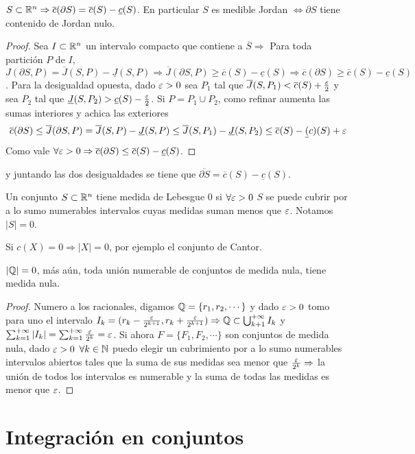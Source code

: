 \begin{theorem}
  $S \subset \mathbb{R}^n \Rightarrow \overline{c}(\partial S) = \overline{c}(S) - \underline{c}(S)$. En particular $S$ es medible Jordan $\iff \partial S$ tiene contenido de Jordan nulo. 
  \begin{proof}
    Sea $I \subset \mathbb{R}^n$ un intervalo compacto que contiene a $\overline{S} \Rightarrow$ Para toda partición $P$ de $I$, $J(\partial S, P) = \overline{J}(S, P) - \underline{J}(S, P) \Rightarrow \overline{J}(\partial S, P) \geq \overline{c}(S) - \underline{c}(S) \Rightarrow \overline{c}(\partial S) \geq \overline{c}(S) - \underline{c}(S)$. Para la desigualdad opuesta, dado $\varepsilon > 0$ sea $P_1$ tal que $\overline{J}(S, P_1) < \overline{c}(S) + \frac{\varepsilon}{2}$ y sea $P_2$ tal que $\underline{J}(S, P_2) > \underline{c}(S) - \frac{\varepsilon}{2}$. Si $P = P_1 \cup P_2$, como refinar aumenta las sumas interiores y achica las exteriores \begin{equation}
      \overline{c}(\partial S) \leq \overline{J}(\partial S, P) = \overline{J}(S, P) - \underline{J}(S, P) \leq \overline{J}(S, P_1) - \underline{J}(S, P_2) \leq \overline{c}(S) - \underline(c)(S) + \varepsilon
    \end{equation}
    Como vale $\forall \varepsilon > 0 \Rightarrow \overline{c}(\partial S) \leq \overline{c}(S) - \underline{c}(S)$.
  \end{proof} y juntando las dos desigualdades se tiene que $\overline{\partial S} = \overline{c}(S) - \underline{c}(S)$.
\end{theorem}

\begin{definition}
  Un conjunto $S \subset \mathbb{R}^n$ tiene medida de Lebesgue $0$ si $\forall \varepsilon > 0$ $S$ se puede cubrir por a lo sumo numerables intervalos cuyas medidas suman menos que $\varepsilon$. Notamos $|S| = 0$. 
\end{definition}

\begin{eg}
  Si $c(X) = 0 \Rightarrow |X| = 0$, por ejemplo el conjunto de Cantor.
\end{eg}

\begin{eg}
  $|\mathbb{Q}| = 0$, más aún, toda unión numerable de conjuntos de medida nula, tiene medida nula.
  \begin{proof}
    Numero a los racionales, digamos $\mathbb{Q} = \{r_1, r_2, \cdots\}$ y dado $\varepsilon > 0$ tomo para uno el intervalo $I_k = (r_k - \frac{\varepsilon}{2^{k+1}}, r_k + \frac{\varepsilon}{2^{k+1}}) \Rightarrow \mathbb{Q} \subset \bigcup_{k + 1}^{+\infty} I_k$ y $\sum_{k = 1}^{+\infty} |I_k| = \sum_{k = 1}^{+\infty} \frac{\varepsilon}{2^k} = \varepsilon$.
    Si ahora $F = \{F_1, F_2, \cdots\}$ son conjuntos de medida nula, dado $\varepsilon > 0$ $\forall k \in \mathbb{N}$ puedo elegir un cubrimiento por a lo sumo numerables intervalos abiertos tales que la suma de sus medidas sea menor que $\frac{\varepsilon}{2^k} \Rightarrow$ la unión de todos los intervalos es numerable y la suma de todas las medidas es menor que $\varepsilon$. 
  \end{proof}
\end{eg}

\section{Integración en conjuntos}
